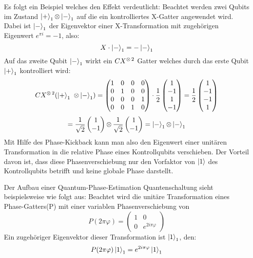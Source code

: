 Es folgt ein Beispiel welches den Effekt verdeutlicht:
Beachtet werden zwei Qubits im Zustand \(\ket{+}_1 \operatorname{\otimes} \ket{-}_1\) auf die ein kontrolliertes X-Gatter angewendet wird.
Dabei ist \(\ket{-}_1\) der Eigenvektor einer X-Transformation mit zugehörigen Eigenwert \(e^{\pi i} = -1\), also: 
\[X \cdot \ket{-}_1=-\ket{-}_1\]
Auf das zweite Qubit \(\ket{-}_1\) wirkt ein \(CX^{\operatorname{\otimes} 2}\) Gatter welches durch das erste Qubit \(\ket{+}_1\) kontrolliert wird:
\[
  CX^{\operatorname{\otimes} 2}( \ket{+}_1\ \operatorname{\otimes} \ket{-}_1) =
  \begin{pmatrix}
    1 & 0 & 0 & 0\\
    0 & 1 & 0 & 0\\
    0 & 0 & 0 & 1\\
    0 & 0 & 1 & 0
  \end{pmatrix}
  \cdot
  \frac{1}{{2}}
  \begin{pmatrix}
    1 \\
    -1 \\
    1 \\
    -1 
  \end{pmatrix}
  =
  \frac{1}{{2}}
  \begin{pmatrix}
    1 \\
    -1 \\
    -1 \\
    1 
  \end{pmatrix}
  \]
  \[
  =
  \frac{1}{{\sqrt{2}}}
  \begin{pmatrix}
    1 \\
    -1 
  \end{pmatrix}
  \operatorname{\otimes}
  \frac{1}{{\sqrt{2}}}
  \begin{pmatrix}
    1 \\
    -1 
  \end{pmatrix}
  =
  \ket{-}_1 \operatorname{\otimes} \ket{-}_1
  \]
Mit Hilfe des Phase-Kickback kann man also den Eigenwert einer unitären Transformation in die relative Phase eines Kontrollqubits verschieben.
Der Vorteil davon ist, 
dass diese Phasenverschiebung nur den Vorfaktor von \(\ket{1}\) des Kontrollqubits betrifft und keine globale Phase darstellt.

Der Aufbau einer Quantum-Phase-Estimation Quantenschaltung sieht beispielsweise wie folgt aus:
Beachtet wird die unitäre Transformation eines Phase-Gatters(P) mit einer variablen Phasenverschiebung von 
\[P(2 \pi \varphi ) = 
\begin{pmatrix}
  1 & 0\\
  0 & e^{2 i \pi \varphi}
\end{pmatrix}\]
Ein zugehöriger Eigenvektor dieser Transformation ist \(\ket{1}_1\), 
den: 
\[P(2 \pi \varphi)\ket{1}_1 = e^{2 i \pi \varphi} \ket{1}_1\]

